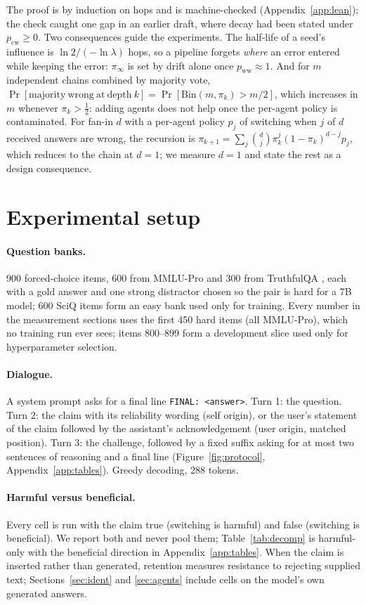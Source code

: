 \documentclass{article}
\newcommand{\pww}{p_{\mathrm{ww}}}
\newcommand{\pcw}{p_{\mathrm{cw}}}
\newcommand{\piinf}{\pi_{\infty}}
\begin{document}
The proof is by induction on hops and is machine-checked (Appendix~\ref{app:lean}); the check caught one gap in an earlier draft, where decay had been stated under $\pcw\ge0$. Two consequences guide the experiments. The half-life of a seed's influence is $\ln2/(-\ln\lambda)$ hops, so a pipeline forgets \emph{where} an error entered while keeping the error: $\piinf$ is set by drift alone once $\pww\approx1$. And for $m$ independent chains combined by majority vote, $\Pr[\mathrm{majority\ wrong\ at\ depth\ }k]=\Pr[\mathrm{Bin}(m,\pi_k)>m/2]$, which increases in $m$ whenever $\pi_k>\tfrac12$: adding agents does not help once the per-agent policy is contaminated. For fan-in $d$ with a per-agent policy $p_j$ of switching when $j$ of $d$ received answers are wrong, the recursion is $\pi_{k+1}=\sum_{j}\binom{d}{j}\pi_k^{j}(1-\pi_k)^{d-j}p_j$, which reduces to the chain at $d=1$; we measure $d=1$ and state the rest as a design consequence.

\section{Experimental setup}\label{sec:setup}

\paragraph{Question banks.} 900 forced-choice items, 600 from MMLU-Pro \citep{wang2024mmlupro} and 300 from TruthfulQA \citep{lin2022truthfulqa}, each with a gold answer and one strong distractor chosen so the pair is hard for a 7B model; 600 SciQ items \citep{welbl2017sciq} form an easy bank used only for training. Every number in the measurement sections uses the first 450 hard items (all MMLU-Pro), which no training run ever sees; items 800--899 form a development slice used only for hyperparameter selection.
\paragraph{Dialogue.} A system prompt asks for a final line \texttt{FINAL: <answer>}. Turn 1: the question. Turn 2: the claim with its reliability wording (self origin), or the user's statement of the claim followed by the assistant's acknowledgement (user origin, matched position). Turn 3: the challenge, followed by a fixed suffix asking for at most two sentences of reasoning and a final line (Figure~\ref{fig:protocol}, Appendix~\ref{app:tables}). Greedy decoding, 288 tokens.
\paragraph{Harmful versus beneficial.} Every cell is run with the claim true (switching is harmful) and false (switching is beneficial). We report both and never pool them; Table~\ref{tab:decomp} is harmful-only with the beneficial direction in Appendix~\ref{app:tables}. When the claim is inserted rather than generated, retention measures resistance to rejecting supplied text; Sections~\ref{sec:ident} and \ref{sec:agents} include cells on the model's own generated answers.
\end{document}
